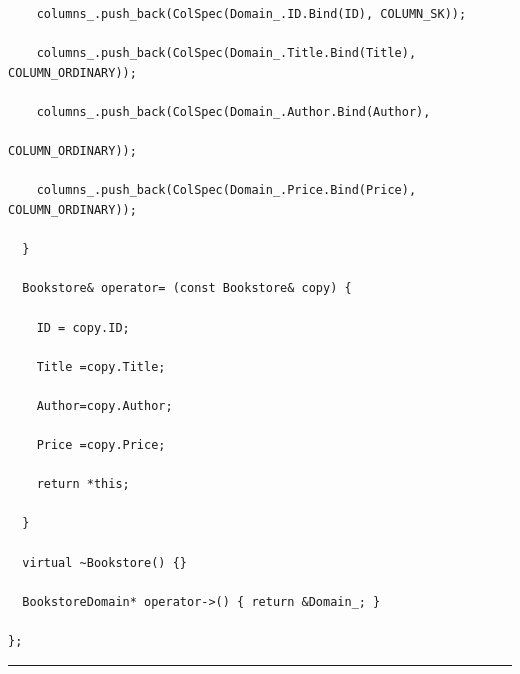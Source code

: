 \begin{verbatim}
    columns_.push_back(ColSpec(Domain_.ID.Bind(ID), COLUMN_SK));

    columns_.push_back(ColSpec(Domain_.Title.Bind(Title), COLUMN_ORDINARY));

    columns_.push_back(ColSpec(Domain_.Author.Bind(Author), 

COLUMN_ORDINARY));

    columns_.push_back(ColSpec(Domain_.Price.Bind(Price), COLUMN_ORDINARY));

  }

  Bookstore& operator= (const Bookstore& copy) {

    ID = copy.ID;

    Title =copy.Title;

    Author=copy.Author;

    Price =copy.Price;

    return *this;

  }

  virtual ~Bookstore() {}

  BookstoreDomain* operator->() { return &Domain_; }

};

\end{verbatim}



\vspace*{6pt}



\hrule



